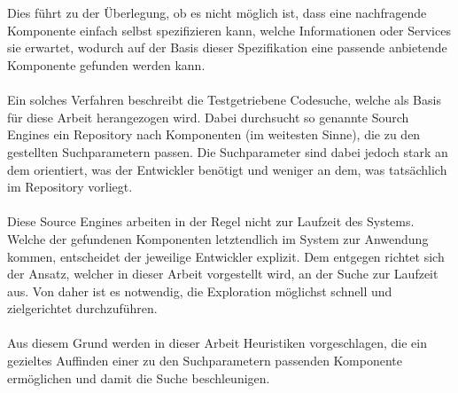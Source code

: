 \\\\
Dies führt zu der Überlegung, ob es nicht möglich ist, dass eine nachfragende Komponente einfach selbst spezifizieren kann, welche Informationen oder Services sie erwartet, wodurch auf der Basis dieser Spezifikation eine passende anbietende Komponente gefunden werden kann.
\\\\
Ein solches Verfahren beschreibt die Testgetriebene Codesuche, welche als Basis für diese Arbeit herangezogen wird. Dabei durchsucht so genannte Sourch Engines ein Repository nach Komponenten (im weitesten Sinne), die zu den gestellten Suchparametern passen. Die Suchparameter sind dabei jedoch stark an dem orientiert, was der Entwickler benötigt und weniger an dem, was tatsächlich im Repository vorliegt.
\\\\
Diese Source Engines arbeiten in der Regel nicht zur Laufzeit des Systems. Welche der gefundenen Komponenten letztendlich im System zur Anwendung kommen, entscheidet der jeweilige Entwickler explizit. Dem entgegen richtet sich der Ansatz, welcher in dieser Arbeit vorgestellt wird, an der Suche zur Laufzeit aus. Von daher ist es notwendig, die Exploration möglichst schnell und zielgerichtet durchzuführen.
\\\\
Aus diesem Grund werden in dieser Arbeit Heuristiken vorgeschlagen, die ein gezieltes Auffinden einer zu den Suchparametern passenden Komponente ermöglichen und damit die Suche beschleunigen.

